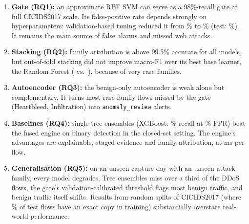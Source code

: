 \begin{enumerate}
    \item \textbf{Gate (RQ1):} an approximate RBF SVM can serve as a 98\%-recall gate at full CICIDS2017 scale. Its false-positive rate depends strongly on hyperparameters: validation-based tuning reduced it from \SvmValFprBefore\% to \SvmValFprAfter\% (test: \EoneGateFpr\%). It remains the main source of false alarms and missed web attacks.
    \item \textbf{Stacking (RQ2):} family attribution is above 99.5\% accurate for all models, but out-of-fold stacking did not improve macro-F1 over its best base learner, the Random Forest (\EoneStackMacroFone{} vs.\ \EoneRfMacroFone), because of very rare families.
    \item \textbf{Autoencoder (RQ3):} the benign-only autoencoder is weak alone but complementary. It turns most rare-family flows missed by the gate (Heartbleed, Infiltration) into \texttt{anomaly\_review} alerts.
    \item \textbf{Baselines (RQ4):} single tree ensembles (XGBoost: \EoneXgbRecall\% recall at \EoneXgbFpr\% FPR) beat the fused engine on binary detection in the closed-set setting. The engine's advantages are explainable, staged evidence and family attribution, at \EoneMsPerFlow{} ms per flow.
    \item \textbf{Generalisation (RQ5):} on an unseen capture day with an unseen attack family, every model degrades. Tree ensembles miss over a third of the DDoS flows, the gate's validation-calibrated threshold flags most benign traffic, and benign traffic itself shifts. Results from random splits of CICIDS2017 (where \EoneOverlap\% of test flows have an exact copy in training) substantially overstate real-world performance.
\end{enumerate}

